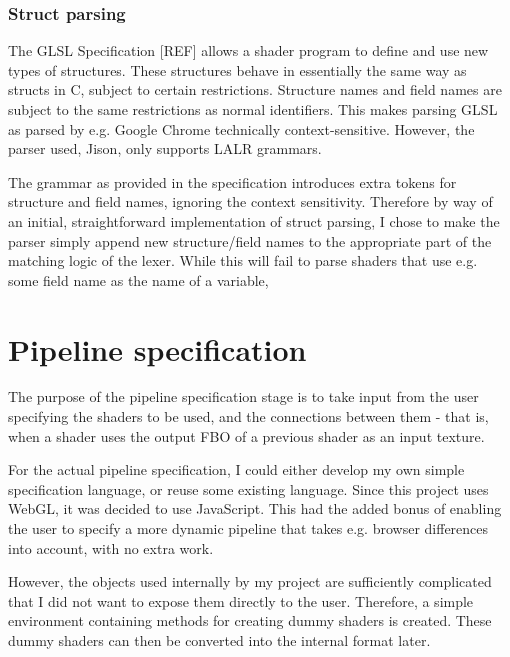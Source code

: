 \documentclass[12pt,twoside,notitlepage]{report}
\begin{document}
\subsubsection{Struct parsing}
The GLSL Specification [REF] allows a shader program to define and use new types of structures. These structures behave in essentially the same way as structs in C, subject to certain restrictions. Structure names and field names are subject to the same restrictions as normal identifiers. This makes parsing GLSL as parsed by e.g. Google Chrome technically context-sensitive. However, the parser used, Jison, only supports LALR grammars.

The grammar as provided in the specification introduces extra tokens for structure and field names, ignoring the context sensitivity. Therefore by way of an initial, straightforward implementation of struct parsing, I chose to make the parser simply append new structure/field names to the appropriate part of the matching logic of the lexer. While this will fail to parse shaders that use e.g. some field name as the name of a variable, 

\section{Pipeline specification}
The purpose of the pipeline specification stage is to take input from the user specifying the shaders to be used, and the connections between them - that is, when a shader uses the output FBO of a previous shader as an input texture.

For the actual pipeline specification, I could either develop my own simple specification language, or reuse some existing language. Since this project uses WebGL, it was decided to use JavaScript. This had the added bonus of enabling the user to specify a more dynamic pipeline that takes e.g. browser differences into account, with no extra work.

However, the objects used internally by my project are sufficiently complicated that I did not want to expose them directly to the user. Therefore, a simple environment containing methods for creating dummy shaders is created. These dummy shaders can then be converted into the internal format later.
\end{document}
